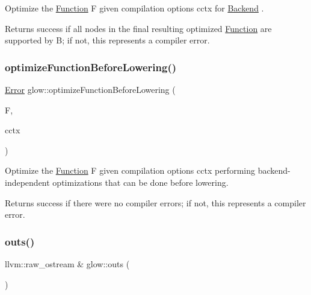 Optimize the \hyperlink{classglow_1_1_function}{Function} {\ttfamily F} given compilation options {\ttfamily cctx} for \hyperlink{classglow_1_1_backend}{Backend} . \begin{DoxyReturn}{Returns}
success if all nodes in the final resulting optimized \hyperlink{classglow_1_1_function}{Function} are supported by {\ttfamily B}; if not, this represents a compiler error. 
\end{DoxyReturn}
\mbox{\label{namespaceglow_a2bc58f10ed9c082dab795b43217a2d51}} 
\subsubsection{\texorpdfstring{optimize\+Function\+Before\+Lowering()}{optimizeFunctionBeforeLowering()}}
{\footnotesize\ttfamily \hyperlink{namespaceglow_afdb176c3a672ef66db0ecfc19a8d39bf}{Error} glow\+::optimize\+Function\+Before\+Lowering (\begin{DoxyParamCaption}\item[{\hyperlink{classglow_1_1_function}{Function} $\ast$}]{F,  }\item[{\hyperlink{structglow_1_1_compilation_context}{Compilation\+Context} \&}]{cctx }\end{DoxyParamCaption})}

Optimize the \hyperlink{classglow_1_1_function}{Function} {\ttfamily F} given compilation options {\ttfamily cctx} performing backend-\/independent optimizations that can be done before lowering. \begin{DoxyReturn}{Returns}
success if there were no compiler errors; if not, this represents a compiler error. 
\end{DoxyReturn}
\mbox{\label{namespaceglow_ae095c93d366edde27fb624fe8963e2d7}} 
\subsubsection{\texorpdfstring{outs()}{outs()}}
{\footnotesize\ttfamily llvm\+::raw\+\_\+ostream \& glow\+::outs (\begin{DoxyParamCaption}{ }\end{DoxyParamCaption})}


